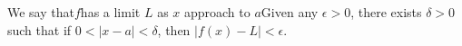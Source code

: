 \documentclass[preview]{standalone}
\begin{document}
\begin{center}
We say that$f$has a limit $L$ as $x$ approach to $a$Given any $\epsilon > 0$, there exists $\delta > 0$ such that if $0 < |x - a| < \delta$, then $|f(x) - L| < \epsilon$.
\end{center}
\end{document}
